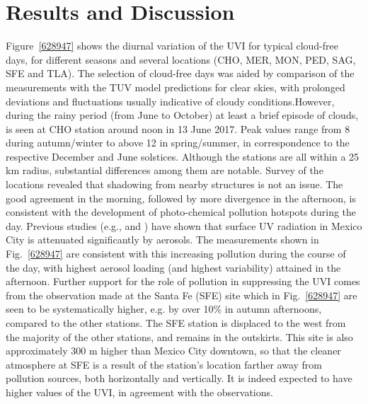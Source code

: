 \documentclass[journal=jacsat,manuscript=article]{achemso}
\begin{document}
\section{Results and Discussion}
\label{results-and-discussion}

Figure~{\ref{628947}} shows the diurnal variation of
the UVI for typical cloud-free days, for different seasons and
several locations (CHO, MER, MON, PED, SAG, SFE and TLA).
The selection of cloud-free days was aided by comparison of the measurements
with the TUV model predictions for clear skies, with prolonged deviations and
fluctuations usually indicative of cloudy conditions.However,
during the rainy period (from June to October) at least a brief episode of clouds,
is seen at CHO station around noon in 13 June
2017. Peak values range from 8 during autumn/winter to above 12
in spring/summer, in correspondence to the respective December and June
solstices. Although the stations are all within a 25 km radius,
substantial differences among them are notable. Survey of the locations
revealed that shadowing from nearby structures is not an issue. The good
agreement in the morning, followed by more divergence in the afternoon,
is consistent with the development of photo-chemical pollution hotspots
during the day. Previous studies (e.g., \citet{Castro_2001} and
\citet{Palancar_2013}) have shown
that surface UV radiation in Mexico City is attenuated significantly by
aerosols. The measurements shown in Fig.~{\ref{628947}}
are consistent with this increasing pollution during the course of the
day, with highest aerosol loading (and highest variability) attained in
the afternoon. Further support for the role of pollution in suppressing
the UVI comes from the observation made at the Santa Fe (SFE) site which
in Fig.~{\ref{628947}} are seen to be systematically
higher, e.g. by over 10\% in autumn afternoons, compared to the other
stations. The SFE station is displaced to the west from the majority of
the other stations, and remains in the outskirts. This site is also
approximately 300 m higher than Mexico City downtown, so that the cleaner atmosphere at SFE
is a result of the station’s location farther away from pollution sources,
both horizontally and vertically.\citep{SEDEMA2018a} It is indeed expected to have
higher values of the UVI, in agreement with the observations.
\end{document}

